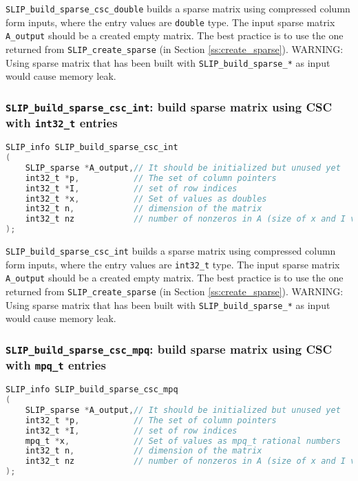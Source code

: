 \documentclass[11pt]{article}
\theoremstyle{definition}
\begin{document}
\verb|SLIP_build_sparse_csc_double| builds a sparse matrix using compressed column form inputs, where the entry values are \verb|double| type. The input sparse matrix \verb|A_output| should be a created empty matrix. The best practice is to use the one returned from \verb|SLIP_create_sparse| (in Section \ref{ss:create_sparse}). WARNING: Using sparse matrix that has been built with \verb|SLIP_build_sparse_*| as input would cause memory leak.

\cprotect\subsubsection{\verb|SLIP_build_sparse_csc_int|: build sparse matrix using CSC with \verb|int32_t| entries}\label{s:user:build_sparse_csc_int}
\begin{lstlisting}[language=C,frame=single]
SLIP_info SLIP_build_sparse_csc_int
(
    SLIP_sparse *A_output,// It should be initialized but unused yet
    int32_t *p,           // The set of column pointers
    int32_t *I,           // set of row indices
    int32_t *x,           // Set of values as doubles
    int32_t n,            // dimension of the matrix
    int32_t nz            // number of nonzeros in A (size of x and I vectors)
);
\end{lstlisting}

\verb|SLIP_build_sparse_csc_int| builds a sparse matrix using compressed column form inputs, where the entry values are \verb|int32_t| type. The input sparse matrix \verb|A_output| should be a created empty matrix. The best practice is to use the one returned from \verb|SLIP_create_sparse| (in Section \ref{ss:create_sparse}). WARNING: Using sparse matrix that has been built with \verb|SLIP_build_sparse_*| as input would cause memory leak.

\cprotect\subsubsection{\verb|SLIP_build_sparse_csc_mpq|: build sparse matrix using CSC with \verb|mpq_t| entries}\label{s:user:build_sparse_csc_mpq}
\begin{lstlisting}[language=C,frame=single]
SLIP_info SLIP_build_sparse_csc_mpq
(
    SLIP_sparse *A_output,// It should be initialized but unused yet
    int32_t *p,           // The set of column pointers
    int32_t *I,           // set of row indices
    mpq_t *x,             // Set of values as mpq_t rational numbers
    int32_t n,            // dimension of the matrix
    int32_t nz            // number of nonzeros in A (size of x and I vectors)
);
\end{lstlisting}
\end{document}
